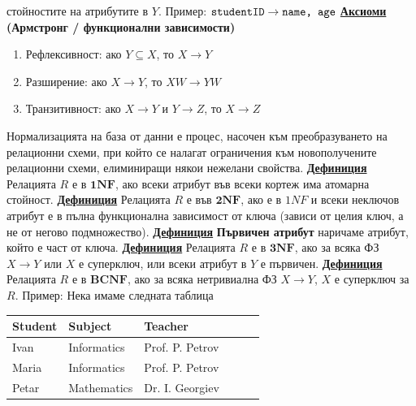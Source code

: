 \documentclass{article}
\newcommand{\sqlplain}[1]{\textcolor{black}{\texttt{#1}}}
\begin{document}
стойностите на атрибутите в $Y$. \newline\newline
Пример: $\sqlplain{studentID} \rightarrow \sqlplain{name, age}$ \newline\newline
\textbf{\underline{Аксиоми} (Армстронг / функционални зависимости)}
\begin{enumerate}
    \item Рефлексивност: ако $Y \subseteq X$, то $X \rightarrow Y$
    \item Разширение: ако $X \rightarrow Y$, то $XW \rightarrow YW$
    \item Транзитивност: ако $X \rightarrow Y$ и $Y \rightarrow Z$, то $X \rightarrow Z$
\end{enumerate}
Нормализацията на база от данни е процес, насочен към преобразуването на релационни схеми, при който се налагат ограничения
към новополучените релационни схеми, елиминиращи някои нежелани свойства. \newline\newline
\textbf{\underline{Дефиниция}}
Релацията $R$ е в $\mathbf{1NF}$, ако всеки атрибут във всеки кортеж има атомарна стойност. \newline\newline
\textbf{\underline{Дефиниция}}
Релацията $R$ е във $\mathbf{2NF}$, ако е в $1NF$ и всеки неключов атрибут е в пълна функционална зависимост от ключа
(зависи от целия ключ, а не от негово подмножество). \newline\newline
\textbf{\underline{Дефиниция}}
\textbf{Първичен атрибут} наричаме атрибут, който е част от ключа. \newline\newline
\textbf{\underline{Дефиниция}}
Релацията $R$ е в $\mathbf{3NF}$, ако за всяка ФЗ $X \rightarrow Y$ или $X$ е суперключ, или всеки атрибут в $Y$ е първичен. \newline\newline
\textbf{\underline{Дефиниция}}
Релацията $R$ е в $\mathbf{BCNF}$, ако за всяка нетривиална ФЗ $X \rightarrow Y$, $X$ е суперключ за $R$. \newline\newline
Пример: \newline
Нека имаме следната таблица
\begin{center}
    \begin{tabularx}{0.7\textwidth}{ 
        | >{\centering\arraybackslash}X 
        | >{\centering\arraybackslash}X 
        | >{\centering\arraybackslash}X 
        | >{\centering\arraybackslash}X
        | >{\centering\arraybackslash}X
        | >{\centering\arraybackslash}X |}
    \hline
    \textbf{Student} & \textbf{Subject} & \textbf{Teacher} \\
    \hline
    Ivan & Informatics & Prof. P. Petrov \\
    \hline
    Maria & Informatics & Prof. P. Petrov \\
    \hline
    Petar & Mathematics & Dr. I. Georgiev \\
    \hline
    \end{tabularx}
\end{center}
\end{document}
